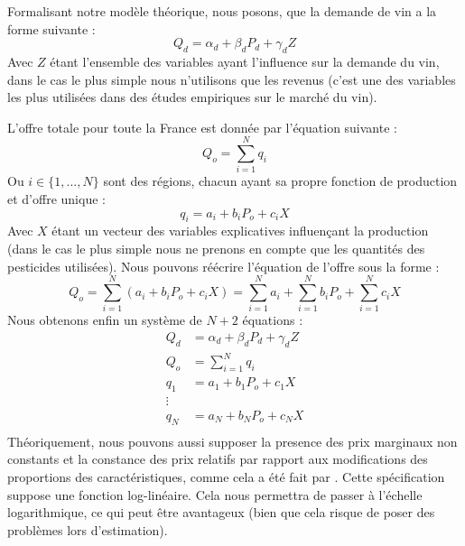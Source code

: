 \documentclass[11pt, a4paper]{article}
\begin{document}
Formalisant notre modèle théorique, nous posons, que la demande de vin a la forme suivante :
\begin{equation}
    Q_d = \alpha_d + \beta_d P_d + \gamma_d Z 
\end{equation}
Avec $Z$ étant l'ensemble des variables ayant l'influence sur la demande du vin, dans le cas le plus simple nous n'utilisons que les revenus (c'est une des variables les plus utilisées dans des études empiriques sur le marché du vin).
\par
L'offre totale pour toute la France est donnée par l'équation suivante : 
\begin{equation}
    Q_o = \sum_{i = 1}^{N} q_i
\end{equation}
Ou $i \in \{1, ..., N\}$ sont des régions, chacun ayant sa propre fonction de production et d'offre unique : 
\begin{equation}
    q_i = a_i + b_i P_o + c_i X
\end{equation}
Avec $X$ étant un vecteur des variables explicatives influençant la production (dans le cas le plus simple nous ne prenons en compte que les quantités des pesticides utilisées).
Nous pouvons réécrire l'équation de l'offre sous la forme :
\begin{equation}
    Q_o = \sum_{i = 1}^{N} (a_i + b_i P_o + c_i X) = \sum_{i = 1}^{N} a_i + \sum_{i = 1}^{N} b_i P_o + \sum_{i = 1}^{N} c_i X
\end{equation}
Nous obtenons enfin un système de $N + 2$ équations : 
\begin{align*}
    Q_d & = \alpha_d + \beta_d P_d + \gamma_d Z \\
    Q_o & = \sum_{i = 1}^{N} q_i \\
    q_1 & = a_1 + b_1 P_o + c_1 X \\ 
    \vdots \\ 
    q_N & = a_N + b_N P_o + c_N X \\
\end{align*}
Théoriquement, nous pouvons aussi supposer la presence des prix marginaux non constants et la constance des prix relatifs par rapport aux modifications des proportions des caractéristiques, comme cela a été fait par \citet{steiner2004}. 
Cette spécification suppose une fonction log-linéaire. 
Cela nous permettra de passer à l'échelle logarithmique, ce qui peut être avantageux (bien que cela risque de poser des problèmes lors d'estimation).
\end{document}
